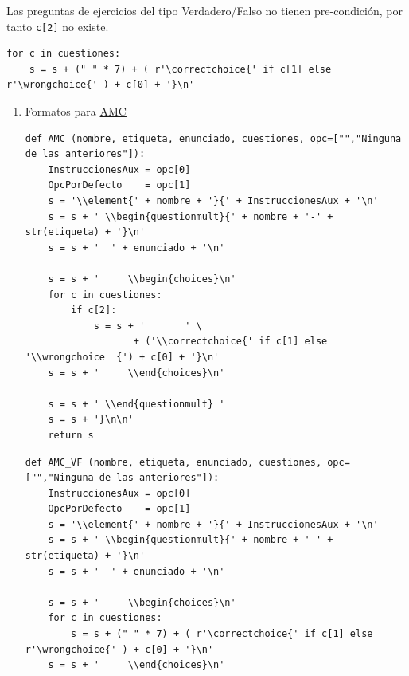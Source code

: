 \documentclass[10pt,a4paper]{report}
\begin{document}
Las preguntas de ejercicios del tipo Verdadero/Falso no tienen pre-condición, por tanto \texttt{c[2]} no existe.
\begin{verbatim}
for c in cuestiones:
    s = s + (" " * 7) + ( r'\correctchoice{' if c[1] else r'\wrongchoice{' ) + c[0] + '}\n'
\end{verbatim}
\begin{enumerate}
\item Formatos para \href{https://www.auto-multiple-choice.net/}{AMC}
\label{sec:org3719d77}

\begin{verbatim}
def AMC (nombre, etiqueta, enunciado, cuestiones, opc=["","Ninguna de las anteriores"]):
    InstruccionesAux = opc[0]
    OpcPorDefecto    = opc[1]
    s = '\\element{' + nombre + '}{' + InstruccionesAux + '\n'
    s = s + ' \\begin{questionmult}{' + nombre + '-' + str(etiqueta) + '}\n'
    s = s + '  ' + enunciado + '\n'

    s = s + '     \\begin{choices}\n'
    for c in cuestiones:
        if c[2]:
            s = s + '       ' \
                   + ('\\correctchoice{' if c[1] else '\\wrongchoice  {') + c[0] + '}\n'
    s = s + '     \\end{choices}\n'

    s = s + ' \\end{questionmult} '
    s = s + '}\n\n'
    return s
\end{verbatim}

\begin{verbatim}
def AMC_VF (nombre, etiqueta, enunciado, cuestiones, opc=["","Ninguna de las anteriores"]):
    InstruccionesAux = opc[0]
    OpcPorDefecto    = opc[1]
    s = '\\element{' + nombre + '}{' + InstruccionesAux + '\n'
    s = s + ' \\begin{questionmult}{' + nombre + '-' + str(etiqueta) + '}\n'
    s = s + '  ' + enunciado + '\n'

    s = s + '     \\begin{choices}\n'
    for c in cuestiones:
        s = s + (" " * 7) + ( r'\correctchoice{' if c[1] else r'\wrongchoice{' ) + c[0] + '}\n'
    s = s + '     \\end{choices}\n'


\end{verbatim}
\end{enumerate}
\end{document}
